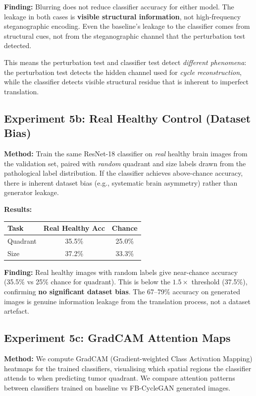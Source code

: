 \documentclass[11pt,a4paper]{article}
\theoremstyle{definition}
\begin{document}
\textbf{Finding:} Blurring does not reduce classifier accuracy for either model. The leakage in both cases is \textbf{visible structural information}, not high-frequency steganographic encoding. Even the baseline's leakage to the classifier comes from structural cues, not from the steganographic channel that the perturbation test detected.

This means the perturbation test and classifier test detect \emph{different phenomena}: the perturbation test detects the hidden channel used for \emph{cycle reconstruction}, while the classifier detects visible structural residue that is inherent to imperfect translation.

\subsection{Experiment 5b: Real Healthy Control (Dataset Bias)}

\textbf{Method:} Train the same ResNet-18 classifier on \emph{real} healthy brain images from the validation set, paired with \emph{random} quadrant and size labels drawn from the pathological label distribution. If the classifier achieves above-chance accuracy, there is inherent dataset bias (e.g., systematic brain asymmetry) rather than generator leakage.

\textbf{Results:}

\begin{center}
\begin{tabular}{lcc}
\toprule
Task & Real Healthy Acc & Chance \\
\midrule
Quadrant & 35.5\% & 25.0\% \\
Size & 37.2\% & 33.3\% \\
\bottomrule
\end{tabular}
\end{center}

\textbf{Finding:} Real healthy images with random labels give near-chance accuracy (35.5\% vs 25\% chance for quadrant). This is below the $1.5 \times$ threshold (37.5\%), confirming \textbf{no significant dataset bias}. The 67--79\% accuracy on generated images is genuine information leakage from the translation process, not a dataset artefact.

\subsection{Experiment 5c: GradCAM Attention Maps}

\textbf{Method:} We compute GradCAM (Gradient-weighted Class Activation Mapping) heatmaps for the trained classifiers, visualising which spatial regions the classifier attends to when predicting tumor quadrant. We compare attention patterns between classifiers trained on baseline vs FB-CycleGAN generated images.
\end{document}
